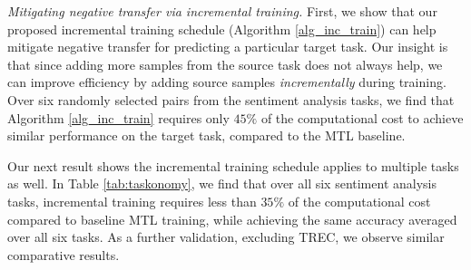 \textit{Mitigating negative transfer via incremental training.}
First, we show that our proposed incremental training schedule (Algorithm \ref{alg_inc_train}) can help mitigate negative transfer for predicting a particular target task.
Our insight is that since adding more samples from the source task does not always help, we can improve efficiency by adding source samples \textit{incrementally} during training.
Over six randomly selected pairs from the sentiment analysis tasks, we find that Algorithm \ref{alg_inc_train} requires only $45\%$ of the computational cost to achieve similar performance on the target task, compared to the MTL baseline.


Our next result shows the incremental training schedule applies to multiple tasks as well.
In Table \ref{tab:taskonomy}, we find that over all six sentiment analysis tasks, incremental training requires less than $35\%$ of the computational cost compared to baseline MTL training, while achieving the same accuracy averaged over all six tasks.
As a further validation, excluding TREC, we observe similar comparative results.


